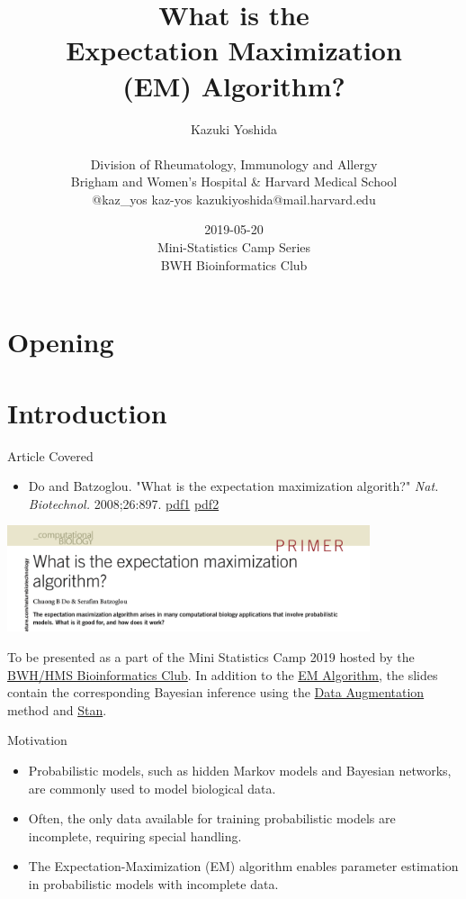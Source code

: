\documentclass[dvipdfmx,bigger,aspectratio=169]{beamer}
\author{Kazuki Yoshida \\ \\ Division of Rheumatology, Immunology and Allergy \\ Brigham and Women's Hospital \& Harvard Medical School \\ \faTwitter @kaz\_yos \faGithub kaz-yos \faEnvelope kazukiyoshida@mail.harvard.edu}
\date{2019-05-20\\ Mini-Statistics Camp Series \\ BWH Bioinformatics Club \\}
\title{What is the \\ Expectation Maximization \\ (EM) Algorithm? \\}
\begin{document}
\maketitle
\section{Opening}
\label{sec:org1cdfcbc}


\section{Introduction}
\label{sec:org9de3882}
\begin{frame}[label={sec:org49dc961}]{Article Covered}
\begin{itemize}
\item Do and Batzoglou. "What is the expectation maximization algorith?" \emph{Nat. Biotechnol.} 2008;26:897. \cite{doWhatExpectationMaximization2008} \href{https://www.cmi.ac.in/\~madhavan/courses/dmml2019jan/literature/EM\_algorithm\_2coin\_example.pdf}{pdf1} \href{http://www.utdallas.edu/\~prr105020/biol6385/2019/lecture/lecture\_4\_em\_paper.pdf}{pdf2}
\end{itemize}
\begin{center}
\includegraphics[page=1,keepaspectratio,width=0.8\textwidth]{./source/em_algo.png}
\end{center}
\footnotesize
To be presented as a part of the Mini Statistics Camp 2019 hosted by the \href{http://bioinformatics.bwh.harvard.edu}{BWH/HMS Bioinformatics Club}. In addition to the \hyperlink{sec:orgd2f2888}{EM Algorithm}, the slides contain the corresponding Bayesian inference using the \hyperlink{sec:orgc38518e}{Data Augmentation} method and \hyperlink{sec:orga462918}{Stan}.
\end{frame}

\begin{frame}[label={sec:orgb8b256b}]{Motivation}
\begin{itemize}
\item Probabilistic models, such as hidden Markov models and Bayesian networks, are commonly used to model biological data.
\end{itemize}


\begin{itemize}
\item Often, the only data available for training probabilistic models are incomplete, requiring special handling.
\end{itemize}


\begin{itemize}
\item The Expectation-Maximization (EM) algorithm enables parameter estimation in probabilistic models with incomplete data.
\end{itemize}
\end{frame}
\end{document}

